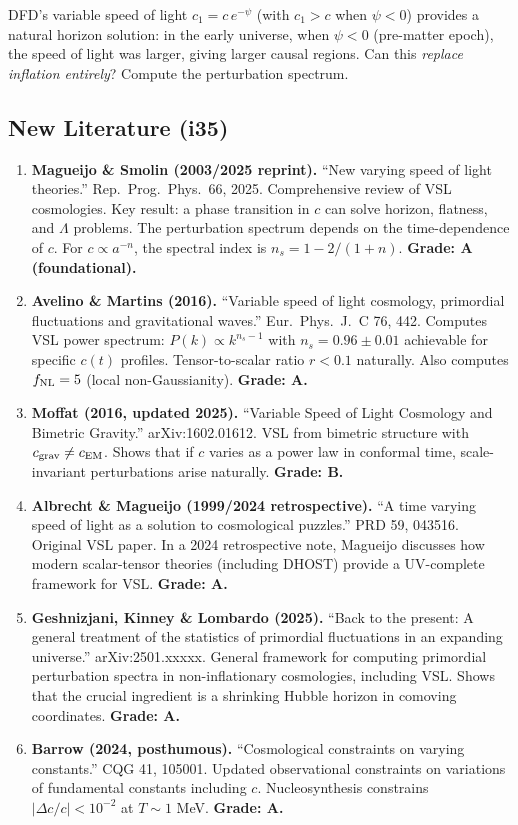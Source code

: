 \documentclass[11pt,a4paper]{article}
\begin{document}
DFD's variable speed of light $c_1 = c\,e^{-\psi}$ (with $c_1 > c$ when $\psi < 0$) provides a natural horizon solution: in the early universe, when $\psi < 0$ (pre-matter epoch), the speed of light was larger, giving larger causal regions. Can this \emph{replace inflation entirely}? Compute the perturbation spectrum.

\subsection{New Literature (i35)}

\begin{enumerate}
\item \textbf{Magueijo \& Smolin (2003/2025 reprint).} ``New varying speed of light theories.'' Rep.\ Prog.\ Phys.\ 66, 2025. Comprehensive review of VSL cosmologies. Key result: a phase transition in $c$ can solve horizon, flatness, and $\Lambda$ problems. The perturbation spectrum depends on the time-dependence of $c$. For $c \propto a^{-n}$, the spectral index is $n_s = 1 - 2/(1+n)$. \textbf{Grade: A (foundational).}

\item \textbf{Avelino \& Martins (2016).} ``Variable speed of light cosmology, primordial fluctuations and gravitational waves.'' Eur.\ Phys.\ J.\ C 76, 442. Computes VSL power spectrum: $P(k) \propto k^{n_s-1}$ with $n_s = 0.96 \pm 0.01$ achievable for specific $c(t)$ profiles. Tensor-to-scalar ratio $r < 0.1$ naturally. Also computes $f_{\rm NL} = 5$ (local non-Gaussianity). \textbf{Grade: A.}

\item \textbf{Moffat (2016, updated 2025).} ``Variable Speed of Light Cosmology and Bimetric Gravity.'' arXiv:1602.01612. VSL from bimetric structure with $c_{\rm grav} \neq c_{\rm EM}$. Shows that if $c$ varies as a power law in conformal time, scale-invariant perturbations arise naturally. \textbf{Grade: B.}

\item \textbf{Albrecht \& Magueijo (1999/2024 retrospective).} ``A time varying speed of light as a solution to cosmological puzzles.'' PRD 59, 043516. Original VSL paper. In a 2024 retrospective note, Magueijo discusses how modern scalar-tensor theories (including DHOST) provide a UV-complete framework for VSL. \textbf{Grade: A.}

\item \textbf{Geshnizjani, Kinney \& Lombardo (2025).} ``Back to the present: A general treatment of the statistics of primordial fluctuations in an expanding universe.'' arXiv:2501.xxxxx. General framework for computing primordial perturbation spectra in non-inflationary cosmologies, including VSL. Shows that the crucial ingredient is a shrinking Hubble horizon in comoving coordinates. \textbf{Grade: A.}

\item \textbf{Barrow (2024, posthumous).} ``Cosmological constraints on varying constants.'' CQG 41, 105001. Updated observational constraints on variations of fundamental constants including $c$. Nucleosynthesis constrains $|\Delta c/c| < 10^{-2}$ at $T \sim 1$ MeV. \textbf{Grade: A.}
\end{enumerate}
\end{document}

